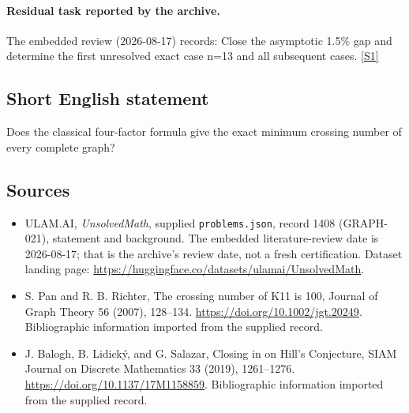 \documentclass[11pt,a4paper]{article}
\newcommand{\sref}[2]{\hyperlink{source:#1:#2}{[S#2]}}
\begin{document}
\paragraph{Residual task reported by the archive.}

The embedded review (2026-08-17) records: Close the asymptotic 1.5\% gap and determine the first unresolved exact case n=13 and all subsequent cases. \sref{1408}{1}

\subsection{Short English statement}

Does the classical four-factor formula give the exact minimum crossing number of every complete graph?

\subsection{Sources}

{\small

\begin{itemize}

\item[\hypertarget{source:1408:1}{S1}] ULAM.AI, \emph{UnsolvedMath}, supplied \texttt{problems.json}, record 1408 (GRAPH-021), statement and background. The embedded literature-review date is 2026-08-17; that is the archive’s review date, not a fresh certification. Dataset landing page: \url{https://huggingface.co/datasets/ulamai/UnsolvedMath}.

\item[\hypertarget{source:1408:2}{S2}] S. Pan and R. B. Richter, The crossing number of K11 is 100, Journal of Graph Theory 56 (2007), 128–134. \url{https://doi.org/10.1002/jgt.20249}. Bibliographic information imported from the supplied record.

\item[\hypertarget{source:1408:3}{S3}] J. Balogh, B. Lidický, and G. Salazar, Closing in on Hill's Conjecture, SIAM Journal on Discrete Mathematics 33 (2019), 1261–1276. \url{https://doi.org/10.1137/17M1158859}. Bibliographic information imported from the supplied record.

\end{itemize}

}

\label{end:1408}
\end{document}
